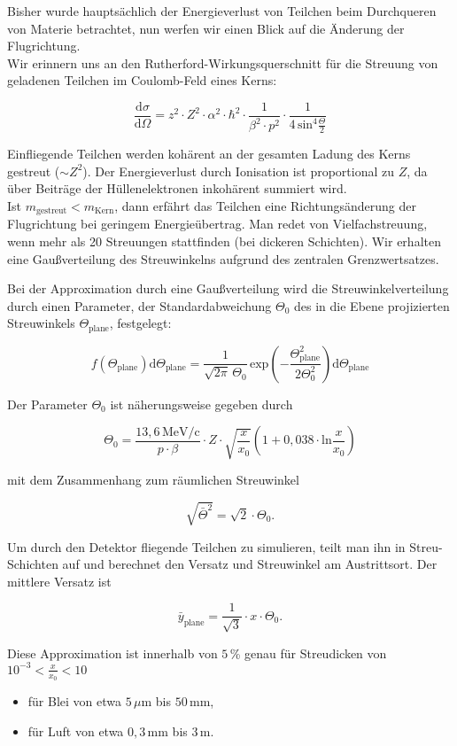 Bisher wurde hauptsächlich der Energieverlust von Teilchen beim Durchqueren von Materie betrachtet,
nun werfen wir einen Blick auf die Änderung der Flugrichtung.
\\
Wir erinnern uns an den Rutherford-Wirkungsquerschnitt für die Streuung von geladenen Teilchen im
Coulomb-Feld eines Kerns:

\[ \frac{\mathrm{d}\sigma}{\mathrm{d}\Omega} = z^2\cdot Z^2\cdot\alpha^2\cdot\hbar^2\cdot
\frac{1}{\beta^2\cdot p^2}\cdot
\frac{1}{4\,\text{sin}^4\frac{\Theta}{2}}
\]

\begin{figure}[H]
		\centering
		
\end{figure}

Einfliegende Teilchen werden kohärent an der gesamten Ladung des Kerns gestreut ($\sim Z^2$). Der
Energieverlust durch Ionisation ist proportional zu $Z$, da über Beiträge der Hüllenelektronen
inkohärent summiert wird.
\\ 
Ist $m_\text{gestreut} < m_\text{Kern}$, dann erfährt das Teilchen eine Richtungsänderung der
Flugrichtung bei geringem Energieübertrag. Man redet von Vielfachstreuung, wenn mehr als 20
Streuungen stattfinden (bei dickeren Schichten). Wir erhalten eine Gaußverteilung des Streuwinkelns
aufgrund des zentralen Grenzwertsatzes.

\begin{figure}[H]
		\centering
		
\end{figure}


Bei der Approximation durch eine Gaußverteilung wird die Streuwinkelverteilung durch einen
Parameter, der Standardabweichung $\Theta_0$ des in die Ebene projizierten Streuwinkels
$\Theta_\text{plane}$, festgelegt:

\[f(\Theta_\text{plane}) \mathrm{d}\Theta_\text{plane} =
\frac{1}{\sqrt{2\pi}\,\Theta_0} \,\text{exp}\left(-\frac{\Theta_\text{plane}^2}{2\Theta_0^2} \right)
\mathrm{d}\Theta_\text{plane}\]

Der Parameter $\Theta_0$ ist näherungsweise gegeben durch

\[\Theta_0 = \frac{13{,}6\,\text{MeV/c}}{p\cdot\beta} \cdot Z\cdot
\sqrt{\frac{x}{x_0}}\left(1+0{,}038\cdot\text{ln}\frac{x}{x_0} \right)   \]

mit dem Zusammenhang zum räumlichen Streuwinkel

\[\sqrt{\bar{\Theta}^2} = \sqrt{2}\cdot\Theta_0.  \]

Um durch den Detektor fliegende Teilchen zu simulieren, teilt man ihn in Streu-Schichten auf und
berechnet den Versatz und Streuwinkel am Austrittsort. Der mittlere Versatz ist

\[ \bar{y}_\text{plane} = \frac{1}{\sqrt{3}}\cdot x \cdot \Theta_0. \]

Diese Approximation ist innerhalb von $5\,$\% genau für Streudicken von $10^{-3}<\frac{x}{x_0}<10$
\begin{itemize}
  \item für Blei von etwa $5\,\mu$m bis $50\,$mm,
  \item für Luft von etwa $0{,}3\,$mm bis $3\,$m.
\end{itemize}


